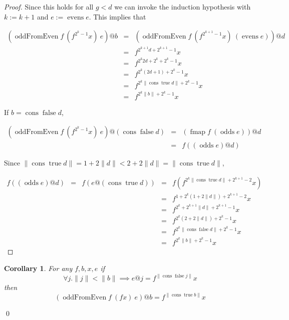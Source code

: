 \documentclass{article}
\DeclareMathOperator{\oddFrom}{oddFromEven}
\DeclareMathOperator{\cons}{cons}
\DeclareMathOperator{\true}{true}
\DeclareMathOperator{\false}{false}
\DeclareMathOperator{\evens}{evens}
\DeclareMathOperator{\odds}{odds}
\DeclareMathOperator{\fmap}{fmap}
\newcommand{\ord}[1]{\|#1\|}
\newtheorem{corollary}[theorem]{Corollary}
\begin{document}
\begin{proof}
Since this holds for all $g < d$ we can invoke the induction hypothesis with $k := k+1$ and $e := \evens e$.
This implies that

\begin{displaymath}
\begin{array}{rcl}
(\oddFrom f\ (f^{2^k-1}x)\ e)@b & = & (\oddFrom f\ (f^{2^{k+1}-1}x)\ (\evens e))@d \\
& = & f^{2^{k+1}d+2^{k+1}-1} x \\
& = & f^{2^k2d+2^k+2^k-1} x \\
& = & f^{2^k(2d+1)+2^k-1} x \\
& = & f^{2^k\ord{\cons \true d}+2^k-1} x \\
& = & f^{2^k\ord{b}+2^k-1} x
\end{array}
\end{displaymath}

If $b = \cons \false d$,

\begin{displaymath}
\begin{array}{rcl}
(\oddFrom f\ (f^{2^k-1}x)\ e)@(\cons \false d)& = & (\fmap f\ (\odds e))@d \\
& = & f ((\odds e)@d)
\end{array}
\end{displaymath}

Since
$\ord{\cons \true d} = 1+2\ord{d} < 2+2\ord{d} = \ord{\cons \true d}$,

\begin{displaymath}
\begin{array}{rcccl}
f((\odds e)@d) & = & f(e@(\cons \true d)) & = & f(f^{2^k\ord{\cons \true d}+2^{k+1}-2}x) \\
& & & = & f^{1+2^k(1+2\ord{d})+2^{k+1}-2}x \\
& & & = & f^{2^k+2^{k+1}\ord{d}+2^{k+1}-1}x \\
& & & = & f^{2^k(2+2\ord{d})+2^k-1}x \\
& & & = & f^{2^k\ord{\cons \false d}+2^k-1}x \\
& & & = & f^{2^k\ord{b}+2^k-1}x
\end{array}
\end{displaymath}

\end{proof}

\begin{corollary}
For any $f, b, x, e$
if
\begin{displaymath}
\forall j . \ord{j} < \ord{b} \implies e@j = f^{\ord{\cons \false j}}x
\end{displaymath}
then
\begin{displaymath}
(\oddFrom f\ (f x)\ e)@b = f^{\ord{\cons \true b}}x
\end{displaymath}
\end{corollary}
\qed
\end{document}
